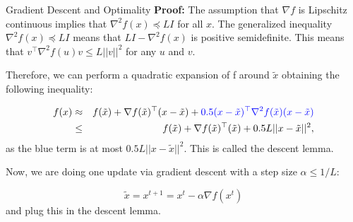 \documentclass[11pt,compress,t,notes=noshow, xcolor=table]{beamer}
\begin{document}
		\begin{frame}{Gradient Descent and Optimality}
			\textbf{Proof: }
			The assumption that $\nabla f$ is Lipschitz continuous implies that $\nabla^2 f(x) \preccurlyeq L I$ for all $x$. The generalized inequality $\nabla^2 f(x) \preccurlyeq L I$ means that $L I - \nabla^2 f(x)$ is positive semidefinite. This means that $v^\top \nabla^2 f(u) v \leq L ||v||^2$ for any $u$ and $v$. 
			
			Therefore, we can perform a quadratic expansion of f around $\tilde{x}$ obtaining the following inequality: 

			\begin{eqnarray*}
				f(x) &\approx& f(\tilde{x}) + \nabla f(\tilde{x})^\top (x - \tilde{x}) + \textcolor{blue}{0.5  (x - \tilde{x})^\top \nabla^2 f(\tilde{x}) (x - \tilde{x})} \\
				& \leq & f(\tilde{x}) + \nabla f(\tilde{x})^\top (\tilde{x}) + 0.5 L ||x - \tilde{x}||^2,
			\end{eqnarray*}		
			as the blue term is at most $0.5 L ||x - \tilde{x}||^2$. This is called the descent lemma. 
			
			Now, we are doing one update via gradient descent with a step size $\alpha \leq 1/L$: 

			$$
			\tilde{x} = x^{t+1} = x^{t} - \alpha \nabla f(x^{t})
			$$ 
			and plug this in the descent lemma.
			

		\end{frame}
\end{document}
